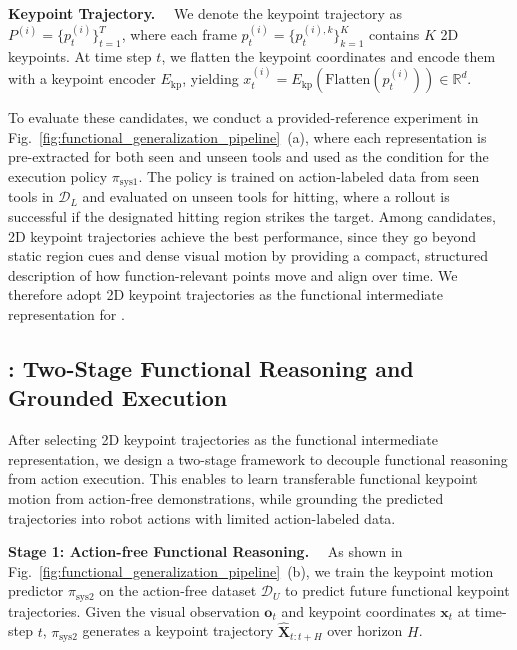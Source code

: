 \textbf{Keypoint Trajectory.}~~
We denote the keypoint trajectory as $P^{(i)}=\{p_t^{(i)}\}_{t=1}^{T}$, where each frame $p_t^{(i)}=\{p_t^{(i),k}\}_{k=1}^{K}$ contains $K$ 2D keypoints.
At time step $t$, we flatten the keypoint coordinates and encode them with a keypoint encoder $E_{\mathrm{kp}}$, yielding $x_t^{(i)}=E_{\mathrm{kp}}(\mathrm{Flatten}(p_t^{(i)}))\in\mathbb{R}^{d}$.


To evaluate these candidates, we conduct a provided-reference experiment in Fig.~\ref{fig:functional_generalization_pipeline}~(a), where each representation is pre-extracted for both seen and unseen tools and used as the condition for the execution policy $\pi_{\mathrm{sys1}}$. The policy is trained on action-labeled data from seen tools in $\mathcal{D}_{L}$ and evaluated on unseen tools for hitting, where a rollout is successful if the designated hitting region strikes the target. Among candidates, 2D keypoint trajectories achieve the best performance, since they go beyond static region cues and dense visual motion by providing a compact, structured description of how function-relevant points move and align over time. We therefore adopt 2D keypoint trajectories as the functional intermediate representation for \algoname{}.




\subsection{\algoname{}: Two-Stage Functional Reasoning and Grounded Execution}
\label{sec:FORGE}
After selecting 2D keypoint trajectories as the functional intermediate representation, we design a two-stage framework to decouple functional reasoning from action execution.
This enables \algoname{} to learn transferable functional keypoint motion from action-free demonstrations, while grounding the predicted trajectories into robot actions with limited action-labeled data.


\textbf{Stage 1: Action-free Functional Reasoning.}~~ 
As shown in Fig.~\ref{fig:functional_generalization_pipeline}~(b), we train the keypoint motion predictor $\pi_{\mathrm{sys2}}$ on the action-free dataset $\mathcal{D}_{U}$ to predict future functional keypoint trajectories. 
Given the visual observation $\mathbf{o}_t$ and keypoint coordinates $\mathbf{x}_t$ at time-step $t$, $\pi_{\mathrm{sys2}}$  generates a keypoint trajectory $\hat{\mathbf{X}}_{t:t+H}$ over horizon $H$. 

